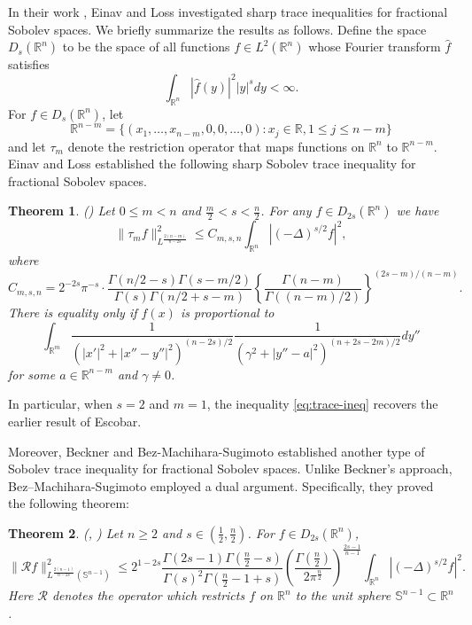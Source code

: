 \documentclass[12pt,reqno]{amsart}%
\newtheorem{theorem}{Theorem}[section]
\theoremstyle{plain}
\numberwithin{equation}{section}
\begin{document}
In their work \cite{ei}, Einav and Loss investigated sharp trace inequalities for fractional Sobolev spaces. We briefly summarize the  results as follows.
Define the space \( D_s(\mathbb{R}^n) \) to be the space of all functions $f \in L^2(\mathbb{R}^n)$ whose Fourier transform $\widehat{f}$ satisfies
\[
\int_{\mathbb{R}^n} |\widehat{f}(y)|^2  |y|^{s}dy < \infty .
\]
For \( f \in D_s(\mathbb{R}^n) \), let $$ \mathbb{R}^{n-m} = \{(x_1, \dots, x_{n-m}, 0, 0, \dots, 0) : x_j \in \mathbb{R}, 1 \leq j \leq n-m\} $$
 and let \( \tau_m \) denote the restriction operator that maps functions on \(\mathbb{R}^n\) to \(\mathbb{R}^{n-m}\).
Einav and Loss established the following sharp Sobolev trace inequality for fractional Sobolev spaces.
\begin{theorem}(\cite[Theorem 1.1]{ei}) \label{th1}
Let $0 \leq m < n$ and $\frac{m}{2} < s < \frac{n}{2}$. For any $f \in D_{2s}(\mathbb{R}^{n})$ we have
\begin{equation}
\label{eq:trace-ineq}
\|\tau_m f\|_{L^{\frac{2(n-m)}{n-2s}}}^2 \leq C_{m,s,n} \int_{\mathbb{R}^{n}}|(-\Delta)^{s/2}f|^{2},
\end{equation}
where
\[
C_{m,s,n} = 2^{-2s} \pi^{-s} \cdot \frac{\Gamma(n/2 - s) \Gamma(s - m/2)}{\Gamma(s) \Gamma(n/2 + s - m)} \left\{ \frac{\Gamma(n - m)}{\Gamma((n - m)/2)} \right\}^{(2s - m)/(n - m)}.
\]
There is equality only if $f(x)$ is proportional to
\begin{equation*}
\int_{\mathbb{R}^m} \frac{1}{\left(|x'|^2 + |x'' - y''|^2\right)^{(n-2s)/2}} \frac{1}{\left(\gamma^2 + |y'' - a|^2\right)^{(n+2s-2m)/2}} dy''
\end{equation*}
for some $a \in \mathbb{R}^{n-m}$ and $\gamma \neq 0$.
\end{theorem}
In particular,  when \( s = 2 \) and \( m = 1 \), the inequality \eqref{eq:trace-ineq} recovers the earlier result of Escobar.


Moreover,   Beckner \cite{be2} and Bez-Machihara-Sugimoto \cite{bez} established another type of Sobolev trace inequality for fractional Sobolev spaces.
Unlike Beckner's approach, Bez--Machihara-Sugimoto employed a dual  argument. Specifically, they proved the following theorem:

\begin{theorem}(\cite[Theorem 5]{be2}, \cite[Theorem 4.1]{bez}) \label{th2}
Let $n \geq 2$ and  $s \in \left(\frac{1}{2}, \frac{n}{2}\right)$. For $f \in D_{2s}(\mathbb{R}^n)$,
\begin{equation}
\label{eq:thm4.1}
\|\mathcal{R}f\|_{L^{\frac{2(n-1)}{n-2s}}(\mathbb{S}^{n-1})}^2 \leq 2^{1-2s} \frac{\Gamma(2s-1)\Gamma\left(\frac{n}{2}-s\right)}{\Gamma(s)^2\Gamma\left(\frac{n}{2}-1+s\right)} \left( \frac{\Gamma\left(\frac{n}{2}\right)}{2\pi^{\frac{n}{2}}} \right)^{\frac{2s-1}{n-1}} \int_{\mathbb{R}^{n}}|(-\Delta)^{s/2}f|^{2}.
\end{equation}
Here $\mathcal{R}$ denotes  the operator which restricts  $f$ on  $\mathbb{R}^n$ to the unit sphere $\mathbb{S}^{n-1}\subset \mathbb{R}^n$.
\end{theorem}
\end{document}
